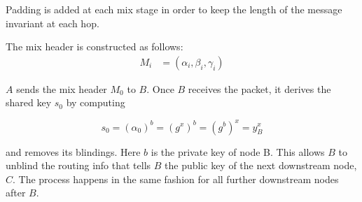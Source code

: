 Padding is added at each mix stage in order to keep the length of the message invariant at each hop.

The mix header is constructed as follows:
\begin{align}
    M_i & =(\alpha_i,\beta_i,\gamma_i)
\end{align}

$A$ sends the mix header $M_0$ to $B$. Once $B$ receives the packet, it derives the shared key $s_0$ by computing

$$s_0=(\alpha_0)^b=(g^x)^b=(g^b)^x=y^x_B$$

and removes its blindings. Here $b$ is the private key of node B. This allows $B$ to unblind the routing info that tells $B$ the public key of the next downstream node, $C$. The process happens in the same fashion for all further downstream nodes after $B$.

